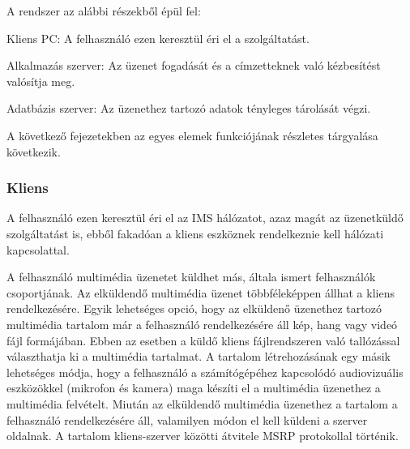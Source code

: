\newpage

A rendszer az alábbi részekből épül fel:
\begin{mydescription}
\item[Kliens PC:] A felhasználó ezen keresztül éri el a szolgáltatást.
\item[Alkalmazás szerver:] Az üzenet fogadását és a címzetteknek való kézbesítést valósítja meg.
\item[Adatbázis szerver:] Az üzenethez tartozó adatok tényleges tárolását végzi.
\end{mydescription}

A következő fejezetekben az egyes elemek funkciójának részletes tárgyalása következik.

\subsubsection{Kliens}
\label{sec:kliens_pc}

A felhasználó ezen keresztül éri el az IMS hálózatot, azaz magát az üzenetküldő szolgáltatást is, ebből fakadóan a kliens eszköznek rendelkeznie kell hálózati kapcsolattal.

A felhasználó multimédia üzenetet küldhet más, általa ismert felhasználók csoportjának. Az elküldendő multimédia üzenet többféleképpen állhat a kliens rendelkezésére. Egyik lehetséges opció, hogy az elküldenő üzenethez tartozó multimédia tartalom már a felhasználó rendelkezésére áll kép, hang vagy videó fájl formájában. Ebben az esetben a küldő kliens fájlrendszeren való tallózással választhatja ki a multimédia tartalmat. A tartalom létrehozásának egy másik lehetséges módja, hogy a felhasználó a számítógépéhez kapcsolódó audiovizuális eszközökkel (mikrofon és kamera) maga készíti el a multimédia üzenethez a multimédia felvételt. Miután az elküldendő multimédia üzenethez a tartalom a felhasználó rendelkezésére áll, valamilyen módon el kell küldeni a szerver oldalnak. A tartalom kliens-szerver közötti átvitele MSRP protokollal történik.

